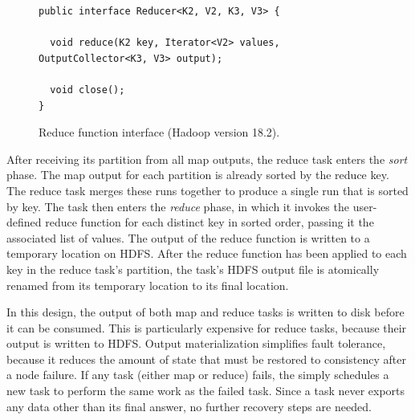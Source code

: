 \begin{figure}[t]
\ssp
\begin{minipage}{\linewidth}
\begin{verbatim}
public interface Reducer<K2, V2, K3, V3> {

  void reduce(K2 key, Iterator<V2> values, OutputCollector<K3, V3> output);

  void close();
}
\end{verbatim}

\end{minipage}
\caption{Reduce function interface (Hadoop version 18.2).}
\label{fig:reducefunction}
\end{figure}

After receiving its partition from all map outputs, the reduce task enters the
\emph{sort} phase. The map output for each partition is already sorted by the
reduce key. The reduce task merges these runs together to produce a single run
that is sorted by key. The task then enters the \emph{reduce} phase, in which it
invokes the user-defined reduce function for each distinct key in sorted order,
passing it the associated list of values. The output of the reduce function is
written to a temporary location on HDFS\@. After the reduce function has been
applied to each key in the reduce task's partition, the task's HDFS output file
is atomically renamed from its temporary location to its final location.

In this design, the output of both map and reduce tasks is written to disk
before it can be consumed. This is particularly expensive for reduce tasks,
because their output is written to HDFS\@. Output materialization simplifies
fault tolerance, because it reduces the amount of state that must be restored to
consistency after a node failure. If any task (either map or reduce) fails, the
{\JT} simply schedules a new task to perform the same work as the failed
task. Since a task never exports any data other than its final answer, no
further recovery steps are needed.






